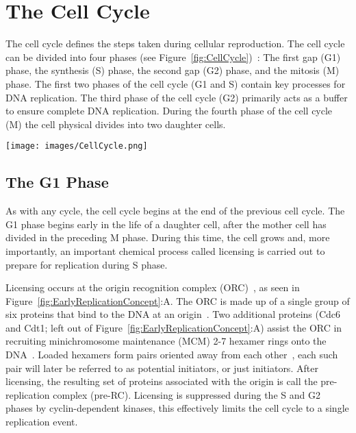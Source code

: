 	\section{The Cell Cycle}
	\label{sec:CellCycle}
	
	The cell cycle defines the steps taken during cellular reproduction.
	The cell cycle can be divided into four phases (see Figure~\ref{fig:CellCycle})~\cite{MolecularCellBiology,CellMolApproach}:
	The first gap (G1) phase, the synthesis (S) phase, the second gap (G2) phase, and the mitosis (M) phase.
	The first two phases of the cell cycle (G1 and S) contain key processes for DNA replication.
	The third phase of the cell cycle (G2) primarily acts as a buffer to ensure complete DNA replication.
	During the fourth phase of the cell cycle (M) the cell physical divides into two daughter cells.
	
	\begin{SCfigure}[1][thb]
		\texttt{[image: images/CellCycle.png]}
		\caption[Cell Cycle]{\label{fig:CellCycle} The complete cell cycle is made up of four phases: 
			The Mitosis (M) phase, when a mother cell separates into two daughter cells. 
			The first Gap (G1) phase, when the daughter cell undergoes growth and chemical preparation for DNA replication.
			The Synthesis (S) phase, when the DNA is replicated.
			And the second Gap (G2) phase which acts as a buffer to ensure complete replication before the M phase.}
	\end{SCfigure}
	
	
		\subsection{The G1 Phase}
		\label{subsec:G1Phase}
		
		As with any cycle, the cell cycle begins at the end of the previous cell cycle.
		The G1 phase begins early in the life of a daughter cell, after the mother cell has divided in the preceding M phase.
		During this time, the cell grows and, more importantly, an important chemical process called licensing is carried out to prepare for replication during S phase.
		
		Licensing occurs at the origin recognition complex (ORC)~\cite{DNAInitiation}, as seen in Figure~\ref{fig:EarlyReplicationConcept}:A.
		The ORC is made up of a single group of six proteins that bind to the DNA at an origin~\cite{ORC}.
		Two additional proteins (Cdc6 and Cdt1; left out of Figure~\ref{fig:EarlyReplicationConcept}:A) assist the ORC in recruiting minichromosome maintenance (MCM) 2-7 hexamer rings onto the DNA~\cite{DNARepInitiation}.
		Loaded hexamers form pairs oriented away from each other~\cite{MCMPairs}, each such pair will later be referred to as potential initiators, or just initiators.
		After licensing, the resulting set of proteins associated with the origin is call the pre-replication complex (pre-RC).
		Licensing is suppressed during the S and G2 phases by cyclin-dependent kinases, this effectively limits the cell cycle to a single replication event.~\cite{MolecularCellBiology}
		
